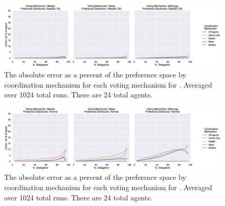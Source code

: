 \begin{landscape}
    \begin{figure}[p]
        \centering
        \includegraphics[scale=0.55]
        {content/chapter2/figures/distributions/Beta_50_50_error_as_percent_of_space_abs_mean}
        \caption{
            The absolute error as a percent of the preference space by coordination
            mechanism for each voting mechanism for .
            Averaged over 1024 total runs.
            There are 24 total agents.
        }
        \label{fig:beta-50-50-error-as-percent-of-space-abs-mean}
    \end{figure}
\end{landscape}

\begin{landscape}
    \begin{figure}[p]
        \centering
        \includegraphics[scale=0.55]
        {content/chapter2/figures/distributions/Normal_error_as_percent_of_space_abs_mean}
        \caption{
            The absolute error as a percent of the preference space by coordination
            mechanism for each voting mechanism for \gaussiandist.
            Averaged over 1024 total runs.
            There are 24 total agents.
        }
        \label{fig:normal-error-as-percent-of-space-abs-mean}
    \end{figure}
\end{landscape}

